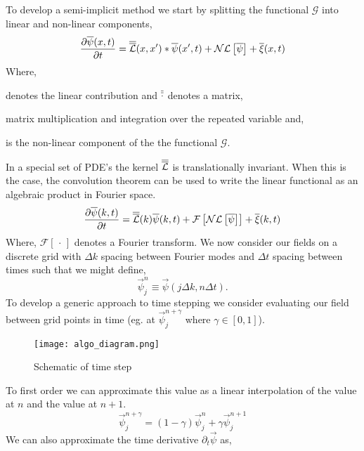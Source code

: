 To develop a semi-implicit method we start by splitting the functional
$\mathcal{G}$ into linear and non-linear components, 
%
\begin{equation}
	\frac{\partial \overline{\psi}(x, t)}{\partial t} = 
        \overline{\overline{\mathcal{L}}}(x, x^\prime) \ast \overline{\psi}(x^\prime, t) 
	  + \mathcal{NL}\left[\overline{\psi}\right] + \overline{\xi}(x, t)
\end{equation} 
%
Where,
%
\begin{description}[align=right, labelwidth=1cm]
    \item[$\tn{\mathcal{L}}$]{denotes the linear contribution and $\overline{\overline{\cdot}}$
        denotes a matrix,
    } 
    \item[$\ast$] {matrix multiplication and integration over
        the repeated variable and,}
    \item[$\mathcal{NL}$]{is the non-linear component of the the 
        functional $\mathcal{G}$.
    }
\end{description}
%
In a special set of PDE's the kernel $\tn{\mathcal{L}}$ is translationally
invariant. When this is the case, the convolution theorem can be used to write
the linear functional as an algebraic product in Fourier space. 
%
\begin{equation}
	\frac{\partial \overline{\psi}(k, t)}{\partial t} = 
        \overline{\overline{\mathcal{L}}}(k)\overline{\psi}(k, t) 
      + \mathcal{F}\left[\mathcal{NL}\left[\overline{\psi}\right]\right] 
      + \overline{\xi}(k, t)
\end{equation}
%
Where, $\mathcal{F}[\,\cdot\,]$ denotes a Fourier transform. We now consider
our fields on a discrete grid with $\Delta k$ spacing between Fourier modes and
$\Delta t$ spacing between times such that we might define, 
%
\begin{equation}
	\vec{\psi}_j^n \equiv \vec{\psi}(j\Delta k, n\Delta t). 
\end{equation}
%
To develop a generic approach to time stepping we consider evaluating our field
between grid points in time (eg. at $\vec{\psi}_j^{n + \gamma}$ where $\gamma
\in [0, 1]$). 
%
\begin{figure}[H]
	\label{schem}
	\begin{center}
	\texttt{[image: algo\_diagram.png]}
	\end{center}
	\caption{Schematic of time step}
\end{figure}
%
To first order we can approximate this value as a linear interpolation of the
value at $n$ and the value at $n + 1$. 
%
\begin{equation}
	\vec{\psi}_j^{n + \gamma} = (1 - \gamma) \vec{\psi}_j^n 
        + \gamma \vec{\psi}_j^{n + 1}
\end{equation}
%
We can also approximate the time derivative $\partial_t \vec{\psi}$ as, 

